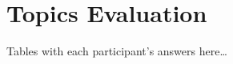 \chapter{Topics Evaluation}
\label{cha:appx-topics-evaluation}
Tables with each participant's answers here\ldots

